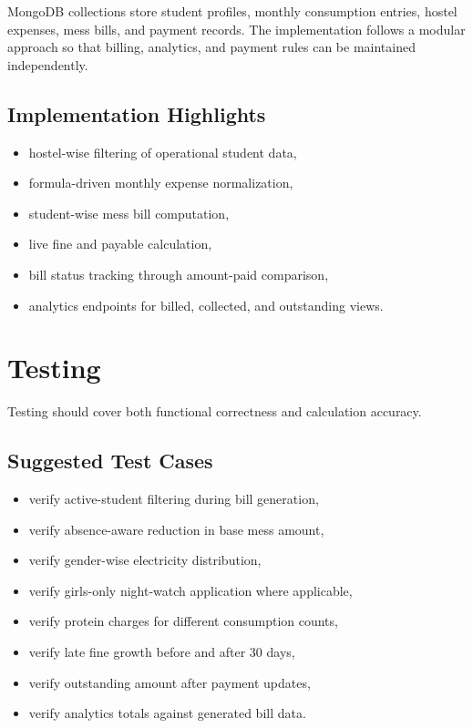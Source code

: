 \documentclass[conference]{IEEEtran}
\begin{document}
MongoDB collections store student profiles, monthly consumption entries, hostel expenses, mess bills, and payment records. The implementation follows a modular approach so that billing, analytics, and payment rules can be maintained independently.

\subsection{Implementation Highlights}
\begin{itemize}
\item hostel-wise filtering of operational student data,
\item formula-driven monthly expense normalization,
\item student-wise mess bill computation,
\item live fine and payable calculation,
\item bill status tracking through amount-paid comparison,
\item analytics endpoints for billed, collected, and outstanding views.
\end{itemize}

\section{Testing}
Testing should cover both functional correctness and calculation accuracy.

\subsection{Suggested Test Cases}
\begin{itemize}
\item verify active-student filtering during bill generation,
\item verify absence-aware reduction in base mess amount,
\item verify gender-wise electricity distribution,
\item verify girls-only night-watch application where applicable,
\item verify protein charges for different consumption counts,
\item verify late fine growth before and after 30 days,
\item verify outstanding amount after payment updates,
\item verify analytics totals against generated bill data.
\end{itemize}
\end{document}
